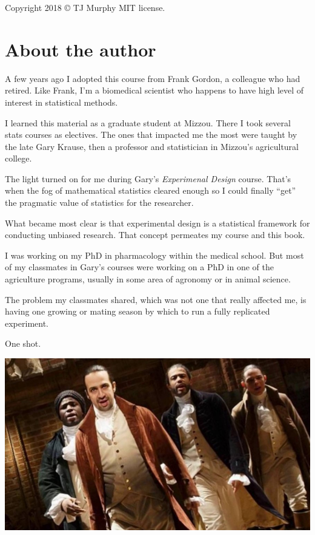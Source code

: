 \documentclass[]{book}
\begin{document}
Copyright 2018 © TJ Murphy MIT license.

\hypertarget{author}{%
\chapter{About the author}\label{author}}

A few years ago I adopted this course from Frank Gordon, a colleague who had retired. Like Frank, I'm a biomedical scientist who happens to have high level of interest in statistical methods.

I learned this material as a graduate student at Mizzou. There I took several stats courses as electives. The ones that impacted me the most were taught by the late Gary Krause, then a professor and statistician in Mizzou's agricultural college.

The light turned on for me during Gary's \emph{Experimenal Design} course. That's when the fog of mathematical statistics cleared enough so I could finally ``get'' the pragmatic value of statistics for the researcher.

What became most clear is that experimental design is a statistical framework for conducting unbiased research. That concept permeates my course and this book.

I was working on my PhD in pharmacology within the medical school. But most of my classmates in Gary's courses were working on a PhD in one of the agriculture programs, usually in some area of agronomy or in animal science.

The problem my classmates shared, which was not one that really affected me, is having one growing or mating season by which to run a fully replicated experiment.

One shot.

\includegraphics[width=12.21in]{images/my_shot}
\end{document}
